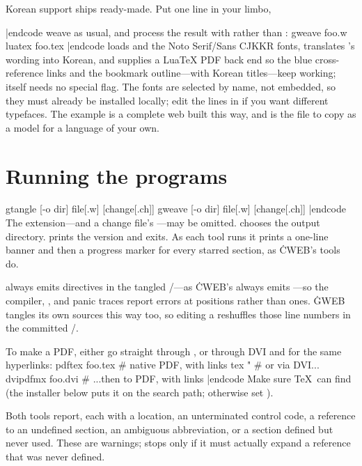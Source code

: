 Korean support ships ready-made. Put one line in your limbo,
\begincode

|endcode
weave as usual, and process the result with  rather than :
\begincode
gweave foo.w
luatex foo.tex
|endcode
 loads  and the Noto Serif/Sans CJK\thinspace KR
fonts, translates 's wording into Korean, and supplies a LuaTeX PDF
back end so the blue cross-reference links and the bookmark outline---with
Korean titles---keep working;  itself needs no special flag. The
fonts are selected by name, not embedded, so they must already be installed
locally; edit the  lines in  if you
want different typefaces. The  example is a complete web built this
way, and  is the file to copy as a model for a language of
your own.

\chapter{Running the programs}
\begincode
gtangle [-o dir] file[.w] [change[.ch]]
gweave  [-o dir] file[.w] [change[.ch]]
|endcode
The  extension---and a change file's ---may be omitted.
 chooses the output directory.  prints the version and exits.
As each tool runs it prints a one-line banner and then a  progress
marker for every starred section, as \.{CWEB}'s tools do.

 always emits  directives in the tangled \GO/---as \.{CWEB}'s
 always emits ---so the compiler, , and panic
traces report errors at  positions rather than  ones. \.{GWEB} tangles
its own sources this way too, so editing a  reshuffles those line numbers
in the committed \GO/.

To make a PDF, either go straight through , or through DVI and
 for the same hyperlinks:
\begincode
pdftex foo.tex                       # native PDF, with links
tex "\let\pdf+        # or via DVI...
dvipdfmx foo.dvi                     # ...then to PDF, with links
|endcode
Make sure \TeX\ can find  (the installer below puts it on the
search path; otherwise set ).

Both tools report, each with a  location, an unterminated control
code, a reference to an undefined section, an ambiguous  abbreviation, or
a section defined but never used. These are warnings;  stops only if
it must actually expand a reference that was never defined.

